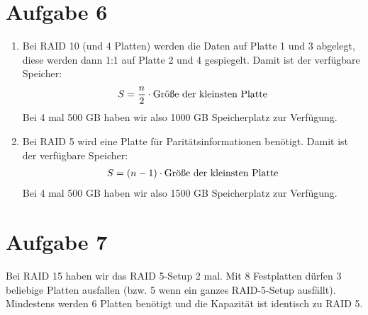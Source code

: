 \documentclass{article}
\begin{document}
	\section*{Aufgabe 6}
	\begin{enumerate}[label=(\alph*)]
		\item Bei RAID 10 (und 4 Platten) werden die Daten auf Platte 1 und 3 abgelegt, diese werden dann 1:1 auf Platte 2 und 4 gespiegelt. Damit ist der verfügbare Speicher:
		\begin{align}
			S = \frac{n}{2}\cdot\text{Größe der kleinsten Platte} \notag
		\end{align}
		Bei 4 mal 500 GB haben wir also 1000 GB Speicherplatz zur Verfügung.
		\item Bei RAID 5 wird eine Platte für Paritätsinformationen benötigt. Damit ist der verfügbare Speicher:
		\begin{align}
			S = (n-1)\cdot\text{Größe der kleinsten Platte} \notag
		\end{align}
		Bei 4 mal 500 GB haben wir also 1500 GB Speicherplatz zur Verfügung.
	\end{enumerate}
	
	\section*{Aufgabe 7}
	Bei RAID 15 haben wir das RAID 5-Setup 2 mal. Mit 8 Festplatten dürfen 3 beliebige Platten ausfallen (bzw. 5 wenn ein ganzes RAID-5-Setup ausfällt). Mindestens werden 6 Platten benötigt und die Kapazität ist identisch zu RAID 5.
\end{document}
